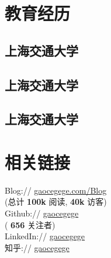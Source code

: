 \documentclass[]{deedy-resume-openfont}
\begin{document}
%
%
\lastupdated


%
%

\begin{minipage}[t]{0.3\textwidth}


\section{教育经历}
\sectionsep

\subsection{上海交通大学}
\sectionsep

\subsection{上海交通大学}
\sectionsep

\subsection{上海交通大学}
\sectionsep


\section{相关链接}
\sectionsep
Blog://  \href{http://gaocegege.com/Blog}{gaocegege.com/Blog} \\
{(总计\textbf{ 100k }阅读,\textbf{ 40k }访客)} \\
Github:// \href{https://github.com/gaocegege}{gaocegege} \\
{(\textbf{ 656 }关注者)} \\
LinkedIn://  \href{https://www.linkedin.com/in/gaocegege}{gaocegege} \\
知乎:// \href{https://www.zhihu.com/people/gaocegege}{gaocegege} \\
\sectionsep


\end{minipage}
\end{document}
